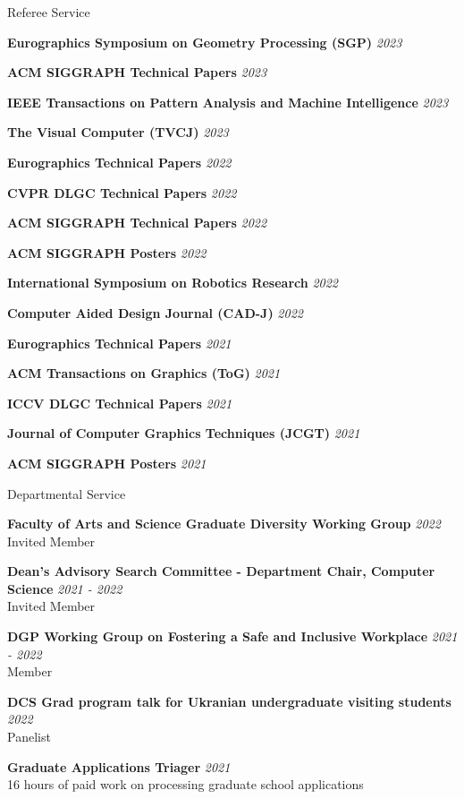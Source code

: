 \documentclass{resume}
\newcommand{\cvitem}[3]{
    {\bf #1} \hfill {\em \small #2} \\ 
    {\small#3 }
}
\newcommand{\cvitemtiny}[2]{
    {\bf #1} \hfill {\em \small #2}
}
\begin{document}
\begin{rSection}{Referee Service}

\cvitemtiny{Eurographics Symposium on Geometry Processing (SGP)}{2023}

\cvitemtiny{ACM SIGGRAPH Technical Papers}{2023}

\cvitemtiny{IEEE Transactions on Pattern Analysis and Machine Intelligence}{2023}

\cvitemtiny{The Visual Computer (TVCJ)}{2023}
    
\cvitemtiny{Eurographics Technical Papers}{2022}

\cvitemtiny{CVPR DLGC Technical Papers}{2022}

\cvitemtiny{ACM SIGGRAPH Technical Papers}{2022}

\cvitemtiny{ACM SIGGRAPH Posters}{2022}

\cvitemtiny{International Symposium on Robotics Research}{2022}

\cvitemtiny{Computer Aided Design Journal (CAD-J)}{2022}

\cvitemtiny{Eurographics Technical Papers}{2021}

\cvitemtiny{ACM Transactions on Graphics (ToG)}{2021}

\cvitemtiny{ICCV DLGC Technical Papers}{2021}

\cvitemtiny{Journal of Computer Graphics Techniques (JCGT)}{2021}

\cvitemtiny{ACM SIGGRAPH Posters}{2021}

\end{rSection}

\begin{rSection}{Departmental Service}

    
\cvitem{Faculty of Arts and Science Graduate Diversity Working Group}{2022}{Invited Member}

\cvitem{Dean's Advisory Search Committee -  Department Chair, Computer Science}{2021 - 2022}{Invited Member}

\cvitem{DGP Working Group on Fostering a Safe and Inclusive Workplace}{2021 - 2022}{Member}

\cvitem{DCS Grad program talk for Ukranian undergraduate visiting students}{2022}{Panelist}

\cvitem{Graduate Applications Triager}{2021}{16 hours of paid work on processing graduate school applications}




\end{rSection}
\end{document}
